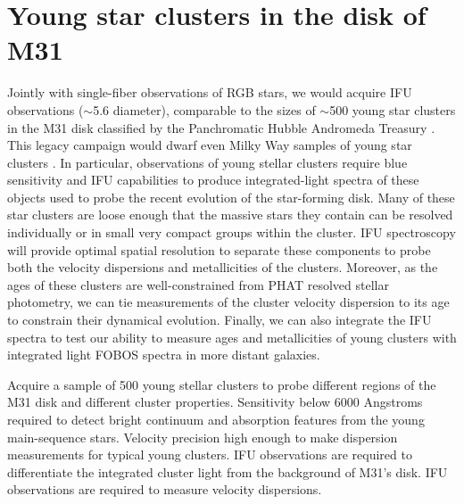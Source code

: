 \documentclass[11pt,a4paper,twoside,onecolumn,openany,final,oldfontcommands]{memoir}
\def\YST#1{\noindent{\textcolor{lblue}{\textbf[YST: #1]}}}
\begin{document}
\section{Young star clusters in the disk of M31}

Jointly with single-fiber observations of RGB stars, we would acquire IFU observations ($\sim$5.6\arcsec{} diameter), comparable to the sizes of $\sim$500  young star clusters in the M31 disk classified by the Panchromatic Hubble Andromeda Treasury \citep[PHAT;][]{johnson15}.  This legacy campaign would dwarf even Milky Way samples of young star clusters \citep{johnson15}.  In particular, observations of young stellar clusters require blue sensitivity and IFU capabilities to produce integrated-light spectra of these objects used to probe the recent evolution of the star-forming disk. Many of these star clusters are loose enough that the massive stars they contain can be resolved individually or in small very compact groups within the cluster.  IFU spectroscopy will provide optimal spatial resolution to separate these components to probe both the velocity dispersions and metallicities of the clusters.  Moreover, as the ages of these clusters are well-constrained from PHAT resolved stellar photometry, we can tie measurements of the cluster velocity dispersion to its age to constrain their dynamical evolution.  Finally, we can also integrate the IFU spectra to test our ability to measure ages and metallicities of young clusters with integrated light FOBOS spectra in more distant galaxies.


\begin{programrequirement}

\reqitem Acquire a sample of 500 young stellar clusters to probe different regions of the M31 disk and different cluster properties.
\reqitem Sensitivity below 6000 Angstroms required to detect bright continuum and absorption features from the young main-sequence stars.
\reqitem Velocity precision high enough to make dispersion measurements for typical young clusters.\YST{maybe be more specific?}  
\reqitem IFU observations are required to differentiate the integrated cluster light from the background of M31's disk.
\reqitem IFU observations are required to measure velocity dispersions.
\end{programrequirement}
\end{document}
